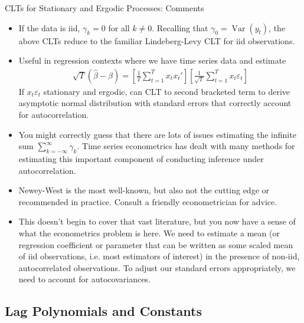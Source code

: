 \documentclass[aspectratio=169, handout]{beamer}
\newcommand{\Var}{\operatorname{Var}}
\newcommand{\sumtT}{\sum^T_{t=1}}
\begin{document}
{\scriptsize
\begin{frame}{CLTs for Stationary and Ergodic Processes: Comments}
\begin{itemize}
  \item If the data is iid, $\gamma_k=0$ for all $k\neq 0$.
    Recalling that $\gamma_0=\Var(y_t)$, the above CLTs \alert{reduce}
    to the familiar \alert{Lindeberg-Levy} CLT for iid observations.

  \pause
  \item Useful in \alert{regression} contexts where we have time series
    data and estimate
    \begin{align*}
      \sqrt{T}(\hat{\beta}-\beta)
      =
      \left[
        \frac{1}{T}
        \sumtT
        x_tx_t'
      \right]
      \left[
        \frac{1}{\sqrt{T}}
        \sumtT
        x_t\varepsilon_t
      \right]
    \end{align*}
    If $x_t\varepsilon_t$ stationary and ergodic, can CLT to second
    bracketed term to derive asymptotic normal distribution with
    standard errors that correctly \alert{account for autocorrelation}.

  \pause
  \item You might correctly guess that there are lots of \alert{issues}
    estimating the infinite sum $\sum_{k=-\infty}^\infty \gamma_k$.
    Time series econometrics has dealt with many methods for estimating
    this important component of conducting inference under
    autocorrelation.

  \pause
  \item \alert{Newey-West} is the most well-known, but also not the
    cutting edge or recommended in practice.
    Consult a friendly econometrician for advice.

  \pause
  \item This doesn't begin to cover that vast literature, but you now
    have a sense of what the econometrics problem is here.
    We need to estimate a mean (or regression coefficient or parameter
    that can be written as some scaled mean of iid observations, i.e.
    most estimators of interest) in the presence of non-iid,
    autocorrelated observations.
    To adjust our standard errors appropriately, we need to account for
    autocovariances.
\end{itemize}
\end{frame}
}


\subsection{Lag Polynomials and Constants}
\end{document}
